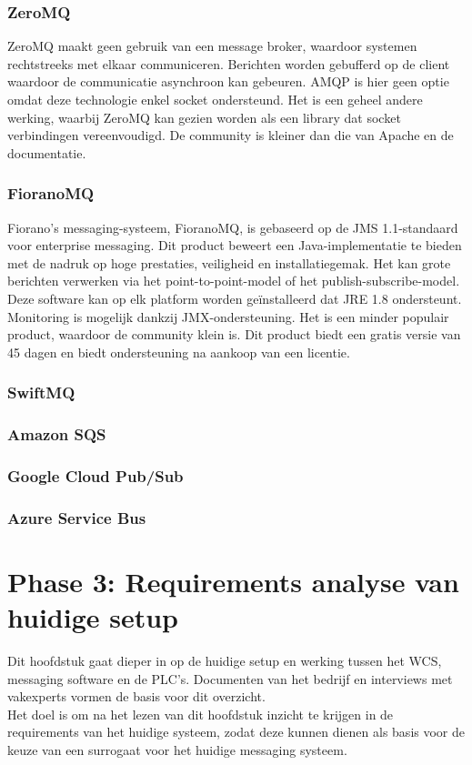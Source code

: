 \subsubsection{ZeroMQ}
ZeroMQ maakt geen gebruik van een message broker, waardoor systemen rechtstreeks met elkaar communiceren.
Berichten worden gebufferd op de client waardoor de communicatie asynchroon kan gebeuren.
AMQP is hier geen optie omdat deze technologie enkel socket ondersteund.
Het is een geheel andere werking, waarbij ZeroMQ kan gezien worden als een library dat socket verbindingen vereenvoudigd.
De community is kleiner dan die van Apache en de documentatie.

\subsubsection{FioranoMQ}
Fiorano's messaging-systeem, FioranoMQ, is gebaseerd op de JMS 1.1-standaard voor enterprise messaging.
Dit product beweert een Java-implementatie te bieden met de nadruk op hoge prestaties, veiligheid en installatiegemak.
Het kan grote berichten verwerken via het point-to-point-model of het publish-subscribe-model.
Deze software kan op elk platform worden geïnstalleerd dat JRE 1.8 ondersteunt.
Monitoring is mogelijk dankzij JMX-ondersteuning.
Het is een minder populair product, waardoor de community klein is.
Dit product biedt een gratis versie van 45 dagen en biedt ondersteuning na aankoop van een licentie.

\subsubsection{SwiftMQ}

\subsubsection{Amazon SQS}

\subsubsection{Google Cloud Pub/Sub}

\subsubsection{Azure Service Bus}

\section{Phase 3: Requirements analyse van huidige setup}
Dit hoofdstuk gaat dieper in op de huidige setup en werking tussen het WCS, messaging software en de PLC's.
Documenten van het bedrijf en interviews met vakexperts vormen de basis voor dit overzicht.
\\
Het doel is om na het lezen van dit hoofdstuk inzicht te krijgen in de requirements van het huidige systeem, 
zodat deze kunnen dienen als basis voor de keuze van een surrogaat voor het huidige messaging systeem.

